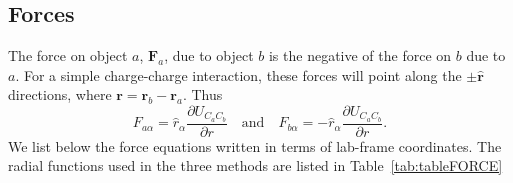 \subsection{Forces}
The force on object $a$, $\mathbf{F}_a$, due to object
$b$ is the negative of the force on $b$ due to $a$. For
a simple charge-charge interaction, these forces will point along the
$\pm \hat{\mathbf{r}}$ directions, where $\mathbf{r}=\mathbf{r}_b -
\mathbf{r}_a $.  Thus
%
\begin{equation}
F_{a \alpha} = \hat{r}_\alpha \frac{\partial U_{C_a C_b}}{\partial r} 
\quad \text{and} \quad  F_{b \alpha} 
= - \hat{r}_\alpha \frac{\partial U_{C_a C_b}} {\partial r}  .
\end{equation}
%
We list below the force equations written in terms of lab-frame
coordinates.  The radial functions used in the three methods are listed
in Table~\ref{tab:tableFORCE}
%
%
%
